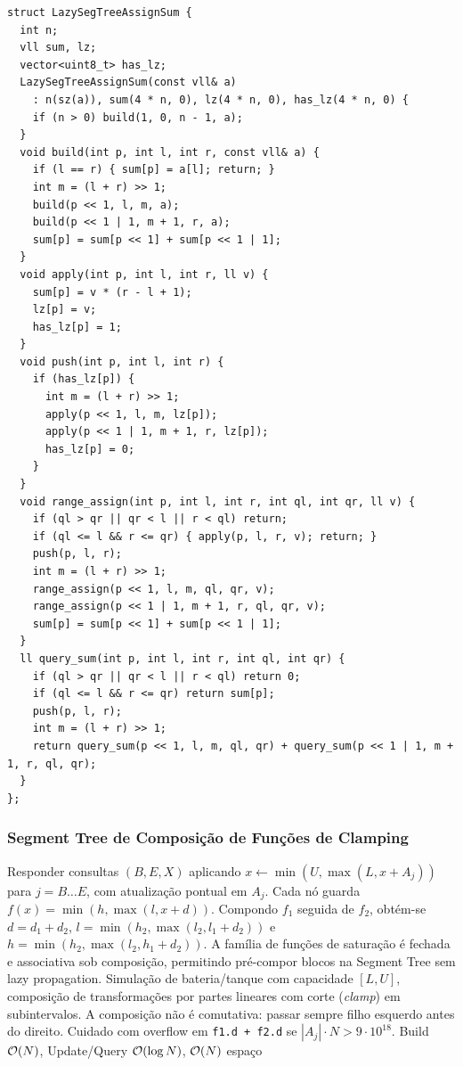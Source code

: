 \begin{lstlisting}
struct LazySegTreeAssignSum {
  int n;
  vll sum, lz;
  vector<uint8_t> has_lz;
  LazySegTreeAssignSum(const vll& a)
    : n(sz(a)), sum(4 * n, 0), lz(4 * n, 0), has_lz(4 * n, 0) {
    if (n > 0) build(1, 0, n - 1, a);
  }
  void build(int p, int l, int r, const vll& a) {
    if (l == r) { sum[p] = a[l]; return; }
    int m = (l + r) >> 1;
    build(p << 1, l, m, a);
    build(p << 1 | 1, m + 1, r, a);
    sum[p] = sum[p << 1] + sum[p << 1 | 1];
  }
  void apply(int p, int l, int r, ll v) {
    sum[p] = v * (r - l + 1);
    lz[p] = v;
    has_lz[p] = 1;
  }
  void push(int p, int l, int r) {
    if (has_lz[p]) {
      int m = (l + r) >> 1;
      apply(p << 1, l, m, lz[p]);
      apply(p << 1 | 1, m + 1, r, lz[p]);
      has_lz[p] = 0;
    }
  }
  void range_assign(int p, int l, int r, int ql, int qr, ll v) {
    if (ql > qr || qr < l || r < ql) return;
    if (ql <= l && r <= qr) { apply(p, l, r, v); return; }
    push(p, l, r);
    int m = (l + r) >> 1;
    range_assign(p << 1, l, m, ql, qr, v);
    range_assign(p << 1 | 1, m + 1, r, ql, qr, v);
    sum[p] = sum[p << 1] + sum[p << 1 | 1];
  }
  ll query_sum(int p, int l, int r, int ql, int qr) {
    if (ql > qr || qr < l || r < ql) return 0;
    if (ql <= l && r <= qr) return sum[p];
    push(p, l, r);
    int m = (l + r) >> 1;
    return query_sum(p << 1, l, m, ql, qr) + query_sum(p << 1 | 1, m + 1, r, ql, qr);
  }
};
\end{lstlisting}

\subsubsection{Segment Tree de Composição de Funções de Clamping}
\algobox
  {Responder consultas $(B, E, X)$ aplicando $x \gets \min(U, \max(L, x + A_j))$ para $j = B \dots E$, com atualização pontual em $A_j$.}
  {Cada nó guarda $f(x) = \min(h, \max(l, x + d))$. Compondo $f_1$ seguida de $f_2$, obtém-se $d = d_1 + d_2$, $l = \min(h_2, \max(l_2, l_1 + d_2))$ e $h = \min(h_2, \max(l_2, h_1 + d_2))$.}
  {A família de funções de saturação é fechada e associativa sob composição, permitindo pré-compor blocos na Segment Tree sem lazy propagation.}
  {Simulação de bateria/tanque com capacidade $[L, U]$, composição de transformações por partes lineares com corte (\emph{clamp}) em subintervalos.}
  {A composição não é comutativa: passar sempre filho esquerdo antes do direito. Cuidado com overflow em \texttt{f1.d + f2.d} se $|A_j| \cdot N > 9 \cdot 10^{18}$.}
  {Build $\mathcal{O}(N)$, Update/Query $\mathcal{O}(\log N)$, $\mathcal{O}(N)$ espaço}

